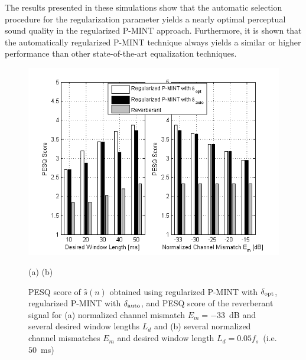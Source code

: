 \documentclass{article}
\begin{document}
The results presented in these simulations show that the automatic selection procedure for the regularization parameter yields a nearly optimal perceptual sound quality in the regularized P-MINT approach. 
Furthermore, it is shown that the automatically regularized P-MINT technique always yields a similar or higher performance than other state-of-the-art equalization techniques.
\begin{figure}[t!]
\centering
\includegraphics[scale = 0.6]{Plots/PESQ_optauto_5}

\hspace{0.7cm} (a) \hspace{3.3cm} (b)
\caption{PESQ score of $\hat{s}(n)$ obtained using regularized P-MINT with $\delta_{\rm opt}$, regularized P-MINT with $\delta_{\rm auto}$, and PESQ score of the reverberant signal for (a) normalized channel mismatch $E_m = -33$~dB and several desired window lengths $L_d$ and (b) several normalized channel mismatches $E_m$ and desired window length $L_d = 0.05 f_s$~(i.e. $50$~ms)}
\label{fig: pesqoptauto}
\end{figure}
\end{document}
